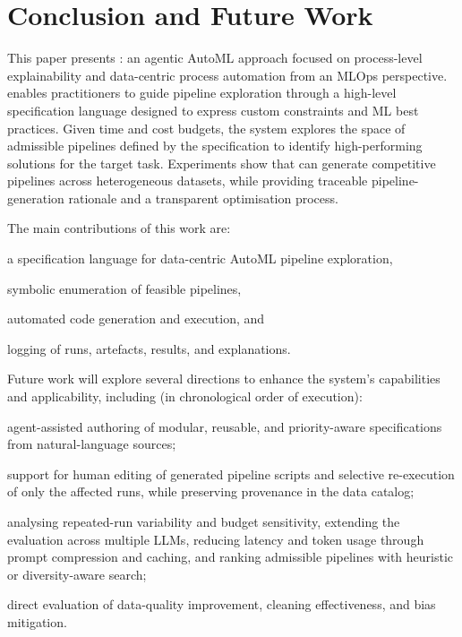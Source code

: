 \documentclass[runningheads]{llncs}
\begin{document}

\section{Conclusion and Future Work}
\label{sec:conclusion}

This paper presents \ourapproach{}:
an agentic \ac{AutoML} approach focused on process-level explainability and data-centric process automation from an \ac{MLOps} perspective.
%
\ourapproach{} enables practitioners to guide pipeline exploration through a high-level specification language designed to express custom constraints and \ac{ML} best practices.
%
Given time and cost budgets,
the system explores the space of admissible pipelines defined by the specification to identify high-performing solutions for the target task.
%
Experiments show that \ourapproach{} can generate competitive pipelines across heterogeneous datasets,
while providing traceable pipeline-generation rationale and a transparent optimisation process.

The main contributions of this work are:
%
\begin{inlinelist}
\item a specification language for data-centric \ac{AutoML} pipeline exploration,
\item symbolic enumeration of feasible pipelines,
\item automated code generation and execution,
and
\item logging of runs, artefacts, results, and explanations.
\end{inlinelist}


Future work will explore several directions to enhance the system's capabilities and applicability,
including (in chronological order of execution):
%
\begin{inlinelist}
\item agent-assisted authoring of modular, reusable, and priority-aware specifications from natural-language sources;
\item support for human editing of generated pipeline scripts and selective re-execution of only the affected runs, 
while preserving provenance in the data catalog;
\item analysing repeated-run variability and budget sensitivity, 
extending the evaluation across multiple \acp{LLM}, 
reducing latency and token usage through prompt compression and caching, 
and ranking admissible pipelines with heuristic or diversity-aware search;
\item direct evaluation of data-quality improvement, cleaning effectiveness, and bias mitigation.
\end{inlinelist}
\end{document}
